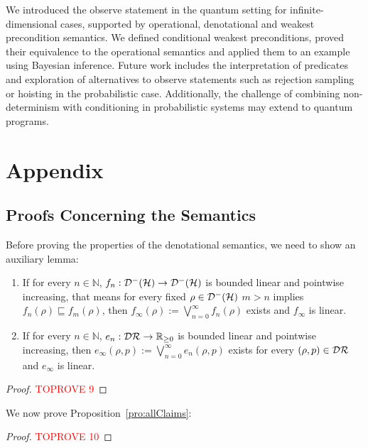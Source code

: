 \documentclass[a4paper,UKenglish,cleveref, autoref, thm-restate]{lipics-v2021}
\begin{document}
We introduced the observe statement in the quantum setting for infinite-dimensional cases, supported by operational, denotational and weakest precondition semantics. We defined conditional weakest preconditions, proved their equivalence to the operational semantics and applied them to an example using Bayesian inference. Future work includes the interpretation of predicates and exploration of alternatives to observe statements such as rejection sampling or hoisting in the probabilistic case. Additionally, the challenge of combining non-determinism with conditioning in probabilistic systems \cite{conditioningProb} may extend to quantum programs. 






\appendix
\section{Appendix}
\label{sec:app}
\subsection{Proofs Concerning the Semantics}
\label{app:semantics}

Before proving the properties of the denotational semantics, we need to show an auxiliary lemma:
\begin{lemma}
    \label{lem:lupislinear}
    \begin{enumerate}
        \item If for every $n\in \mathbb{N}$, $f_n: \mathcal{D}^- (\mathcal{H}) \to \mathcal{D}^- (\mathcal{H})$ is bounded linear and pointwise increasing, that means for every fixed $\rho \in \mathcal{D}^- (\mathcal{H})$ $m>n$ implies $f_n(\rho) \sqsubseteq f_m(\rho)$, then $f_\infty (\rho) := \bigvee_{n=0}^\infty f_n(\rho)$ exists and $f_\infty$ is linear.
        \item If for every $n \in \mathbb{N}$, $e_n:\mathcal{D}\mathcal{R} \to \mathbb{R}_{\geq 0}$ is bounded linear and pointwise increasing, then $e_\infty (\rho,p) := \bigvee_{n=0}^\infty e_n(\rho,p)$ exists for every $(\rho,p) \in \mathcal{D}\mathcal{R}$ and $e_\infty$ is linear.
    \end{enumerate}

\end{lemma}
\begin{proof}\textcolor{red}{TOPROVE 9}\end{proof}

We now prove Proposition~\ref{pro:allClaims}:
\begin{proof}\textcolor{red}{TOPROVE 10}\end{proof}
\end{document}
